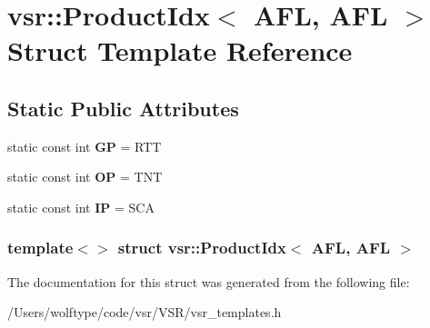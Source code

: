 \hypertarget{structvsr_1_1_product_idx_3_01_a_f_l_00_01_a_f_l_01_4}{\section{vsr\-:\-:Product\-Idx$<$ A\-F\-L, A\-F\-L $>$ Struct Template Reference}
\label{structvsr_1_1_product_idx_3_01_a_f_l_00_01_a_f_l_01_4}
}
\subsection*{Static Public Attributes}
\begin{DoxyCompactItemize}
\item 
\hypertarget{structvsr_1_1_product_idx_3_01_a_f_l_00_01_a_f_l_01_4_a9a89991c694d3c1a3192eb65f780a924}{static const int {\bfseries G\-P} = R\-T\-T}\label{structvsr_1_1_product_idx_3_01_a_f_l_00_01_a_f_l_01_4_a9a89991c694d3c1a3192eb65f780a924}

\item 
\hypertarget{structvsr_1_1_product_idx_3_01_a_f_l_00_01_a_f_l_01_4_a69099009c3fd6356aaee8d4efefd564b}{static const int {\bfseries O\-P} = T\-N\-T}\label{structvsr_1_1_product_idx_3_01_a_f_l_00_01_a_f_l_01_4_a69099009c3fd6356aaee8d4efefd564b}

\item 
\hypertarget{structvsr_1_1_product_idx_3_01_a_f_l_00_01_a_f_l_01_4_aef7da2a57ecf7afa21dd272e4002bf4b}{static const int {\bfseries I\-P} = S\-C\-A}\label{structvsr_1_1_product_idx_3_01_a_f_l_00_01_a_f_l_01_4_aef7da2a57ecf7afa21dd272e4002bf4b}

\end{DoxyCompactItemize}
\subsubsection*{template$<$$>$ struct vsr\-::\-Product\-Idx$<$ A\-F\-L, A\-F\-L $>$}



The documentation for this struct was generated from the following file\-:\begin{DoxyCompactItemize}
\item 
/\-Users/wolftype/code/vsr/\-V\-S\-R/vsr\-\_\-templates.\-h\end{DoxyCompactItemize}
